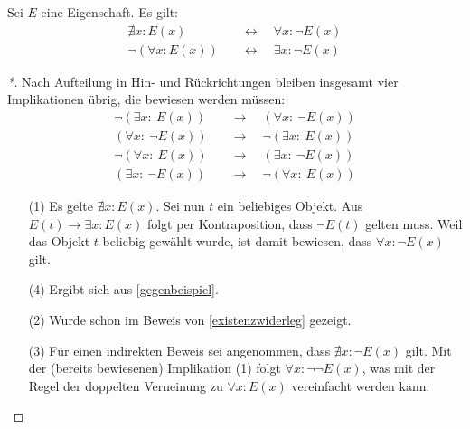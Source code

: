 \begin{satz} \label{quantorennegieren} 
    Sei $E$ eine Eigenschaft. Es gilt:
    \begin{align*}
        \nexists x: E(x) \quad& \leftrightarrow\quad \forall x: \neg E(x) \\
        \neg (\forall x: E(x)) \quad& \leftrightarrow\quad \exists x: \neg E(x)
    \end{align*}
\end{satz}
\begin{proof}[*]
    Nach Aufteilung in Hin- und Rückrichtungen bleiben insgesamt vier Implikationen übrig, die bewiesen werden müssen:
    \begin{align}
        \neg (\exists x:\ E(x)) \quad& \to\quad (\forall x:\ \neg E(x)) \tag{1} \\
        (\forall x:\ \neg E(x)) \quad& \to\quad \neg (\exists x:\ E(x)) \tag{2} \\
        \neg (\forall x:\ E(x)) \quad& \to\quad (\exists x:\ \neg E(x)) \tag{3} \\
        (\exists x:\ \neg E(x)) \quad& \to\quad \neg (\forall x:\ E(x)) \tag{4}
    \end{align}
    \begin{enumerate}
        \item[(1)] Es gelte $\nexists x : E(x)$. Sei nun $t$ ein beliebiges Objekt. Aus $E(t)\to\exists x: E(x)$ folgt per Kontraposition, dass $\neg E(t)$ gelten muss. Weil das Objekt $t$ beliebig gewählt wurde, ist damit bewiesen, dass $\forall x: \neg E(x)$ gilt.
        \item[(4)] Ergibt sich aus \cref{gegenbeispiel}.
        \item[(2)] Wurde schon im Beweis von \cref{existenzwiderleg} gezeigt.
        \item[(3)] Für einen indirekten Beweis sei angenommen, dass $\nexists x: \neg E(x)$ gilt. Mit der (bereits bewiesenen) Implikation (1) folgt $\forall x: \neg\neg E(x)$, was mit der Regel der doppelten Verneinung zu $\forall x: E(x)$ vereinfacht werden kann. \qedhere
    \end{enumerate}
\end{proof}


